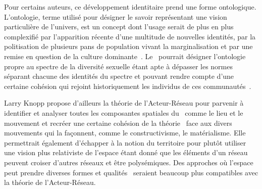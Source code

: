 Pour certains auteurs, ce développement identitaire prend une forme ontologique.
L'ontologie, terme utilisé pour désigner le savoir représentant une vision particulière de l'univers, est un concept dont l'usage serait de plus en plus complexifié par l'apparition récente d'une multitude de nouvelles identités, par la politisation de plusieurs pans de population vivant la marginalisation et par une remise en question de la culture dominante~\citep[122]{Knopp2004}. 
Le \qu\ pourrait désigner l'ontologie propre au spectre de la diversité sexuelle étant apte à dépasser les normes séparant chacune des identités du spectre \lgbt{} et pouvant rendre compte d'une certaine cohésion qui rejoint historiquement les individus de ces communautés~\citep[122]{Knopp2004}.

Larry Knopp propose d'ailleurs la théorie de l'Acteur-Réseau pour parvenir à identifier et analyser toutes les composantes spatiales du \qu\ comme le lieu et le mouvement et recréer une certaine cohésion de la théorie \qu\ face aux divers mouvements qui la façonnent, comme le constructivisme, le matérialisme. 
Elle permettrait également d'échapper à la notion du territoire pour plutôt utiliser une vision plus relativiste de l'espace étant donné que les éléments d'un réseau peuvent croiser d'autres réseaux et être polysémiques. 
Des approches où l'espace peut prendre diverses formes et qualités~\citep{DiMeo1998} seraient beaucoup plus compatibles avec la théorie de l'Acteur-Réseau.

